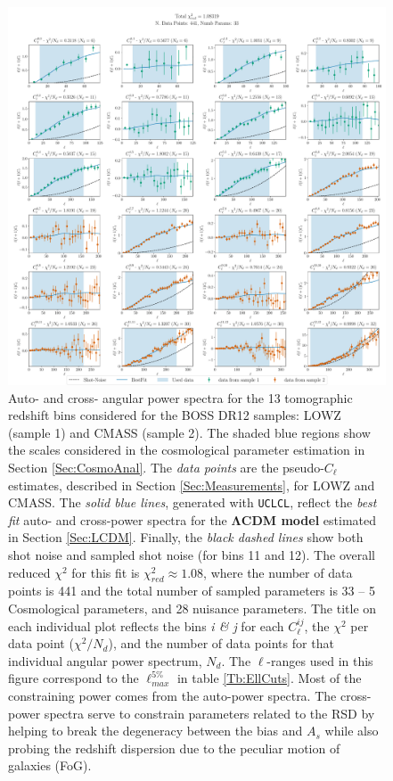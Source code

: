 \begin{figure}
\begin{center}
\includegraphics[width=1.05\columnwidth]{BOSS-FIGS/BestFit_LCDM.pdf}
\caption[BOSS measured $C_{\ell}$s and the best-fit theory from the $\Lambda$CDM model.]{Auto- and cross- angular power spectra for the 13 tomographic redshift bins considered for the BOSS DR12 samples: LOWZ (sample 1) and CMASS (sample 2). The shaded blue regions show the scales considered in the cosmological parameter estimation in Section \ref{Sec:CosmoAnal}. The \textit{data points} are the pseudo-$C_{\ell}$ estimates, described in Section \ref{Sec:Measurements}, for LOWZ and CMASS. The \textit{solid blue lines}, generated with \texttt{UCLCL}, reflect the \textit{best fit} auto- and cross-power spectra for the \textbf{$\mathbf{\Lambda}$CDM model} estimated in Section \ref{Sec:LCDM}. Finally, the \textit{black dashed lines} show both shot noise and sampled shot noise (for bins 11 and 12). The overall reduced $\chi^2$ for this fit is $\chi^2_{red} \approx 1.08$, where the number of data points is 441 and the total number of sampled parameters is 33 -- 5 Cosmological parameters, and 28 nuisance parameters. The title on each individual plot reflects the bins \textit{i \& j} for each $C^{ij}_{\ell}$, the $\chi^2$ per data point ($\chi^2/N_d$), and the number of data points for that individual angular power spectrum, $N_d$. The $\ell$-ranges used in this figure correspond to the $\ell_{max}^{5\%}$ in table \ref{Tb:EllCuts}. Most of the constraining power comes from the auto-power spectra. The cross-power spectra serve to constrain parameters related to the RSD by helping to break the degeneracy between the bias and $A_s$ while also probing the redshift dispersion due to the peculiar motion of galaxies (FoG).}
\label{fig:Cl_Bestfit}
\end{center}
\end{figure}


